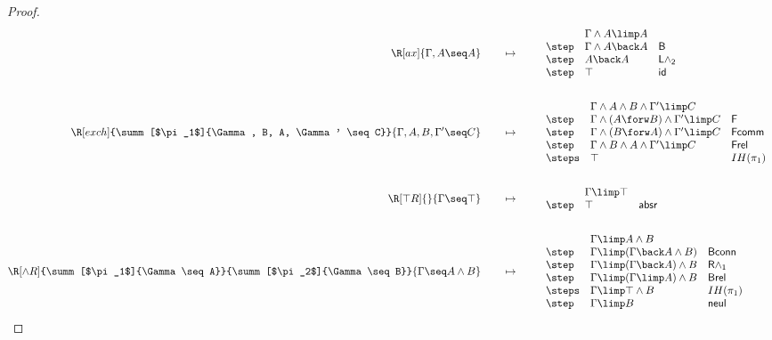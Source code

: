 \begin{proof}
  \newcommand{\mt}{\qquad\mapsto\qquad}
  \begin{align*}
    \R[ax]
      {\Gamma, A \seq A}
    &\mt
    \begin{array}{lll}
            & \Gamma \land A \limp A & \\
      \step & \Gamma \land A \back A & \mathsf{B} \\
      \step & A \back A & \mathsf{L\land_2} \\
      \step & \top & \mathsf{id}
    \end{array}
    \\\\
    \R[exch]
      {\summ[$\pi_1$]{\Gamma, B, A, \Gamma' \seq C}}
      {\Gamma, A, B, \Gamma' \seq C}
    &\mt
    \begin{array}{lll}
            & \Gamma \land A \land B \land \Gamma' \limp C & \\
      \step & \Gamma \land (A \forw B) \land \Gamma' \limp C & \mathsf{F} \\
      \step & \Gamma \land (B \forw A) \land \Gamma' \limp C & \mathsf{Fcomm} \\
      \step & \Gamma \land B \land A \land \Gamma' \limp C & \mathsf{Frel} \\
      \steps & \top & IH(\pi_1)
    \end{array}
    \\\\
    \R[\top R]
      {}
      {\Gamma \seq \top}
    &\mt
    \begin{array}{lll}
            & \Gamma \limp \top & \\
      \step & \top & \mathsf{absr}
    \end{array}
    \\\\
    \R[\land R]
      {\summ[$\pi_1$]{\Gamma \seq A}}
      {\summ[$\pi_2$]{\Gamma \seq B}}
      {\Gamma \seq A \land B}
    &\mt
    \begin{array}{lll}
            & \Gamma \limp A \land B & \\
      \step & \Gamma \limp (\Gamma \back A \land B) & \mathsf{Bconn} \\
      \step & \Gamma \limp (\Gamma \back A) \land B & \mathsf{R\land_1} \\
      \step & \Gamma \limp (\Gamma \limp A) \land B & \mathsf{Brel} \\
      \steps & \Gamma \limp \top \land B & IH(\pi_1) \\
      \step & \Gamma \limp B & \mathsf{neul} \\

\end{array}
\end{align*}
\end{proof}
